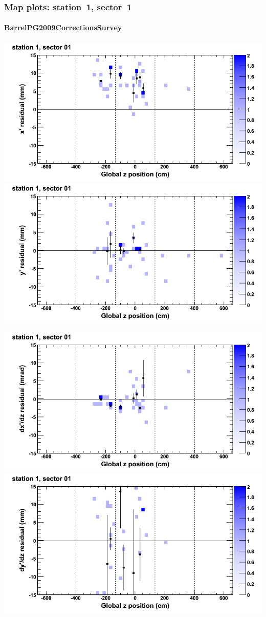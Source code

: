 \documentclass[compress]{beamer}
\begin{document}
\begin{frame}
\frametitle{Map plots: station~1, sector~1}
\framesubtitle{BarrelPG2009CorrectionsSurvey}
\includegraphics[width=0.5\linewidth]{mapplots_01/DTvsz_st1sec01_x.png}
\includegraphics[width=0.5\linewidth]{mapplots_01/DTvsz_st1sec01_y.png}

\includegraphics[width=0.5\linewidth]{mapplots_01/DTvsz_st1sec01_dxdz.png}
\includegraphics[width=0.5\linewidth]{mapplots_01/DTvsz_st1sec01_dydz.png}
\end{frame}
\end{document}
